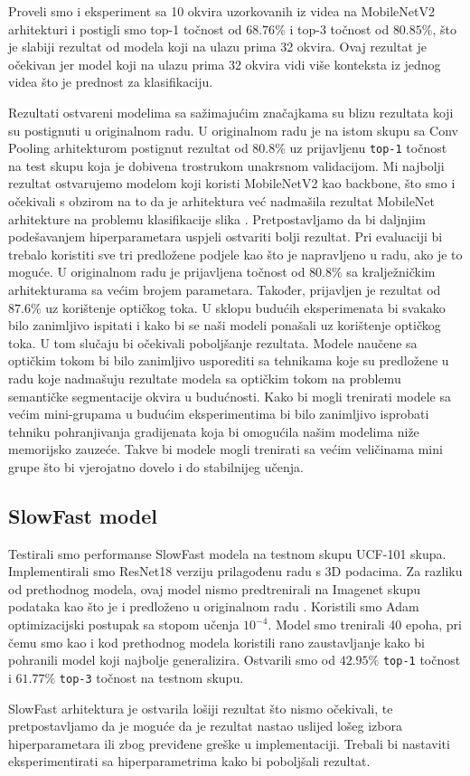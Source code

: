 \documentclass[times, utf8, diplomski,  numeric]{fer}
\begin{document}
\par
Proveli smo i eksperiment sa 10 okvira uzorkovanih iz videa na MobileNetV2 arhitekturi i postigli smo top-1 točnost od $68.76\%$ i top-3 točnost od $80.85\%$, što je slabiji rezultat od modela koji na ulazu prima 32 okvira. Ovaj rezultat je očekivan jer model koji na ulazu prima 32 okvira vidi više konteksta iz jednog videa što je prednost za klasifikaciju.
\par
Rezultati ostvareni modelima sa sažimajućim značajkama su blizu rezultata koji su postignuti u originalnom radu. U originalnom radu je na istom skupu sa Conv Pooling arhitekturom postignut rezultat od 80.8\% uz prijavljenu \verb|top-1| točnost na test skupu koja je dobivena trostrukom unakrsnom validacijom. Mi najbolji rezultat ostvarujemo modelom koji koristi MobileNetV2 kao backbone, što smo i očekivali s obzirom na to da je arhitektura već nadmašila rezultat MobileNet arhitekture na problemu klasifikacije slika \cite{mobilenetv2}. Pretpostavljamo da bi daljnjim podešavanjem hiperparametara uspjeli ostvariti bolji rezultat. Pri evaluaciji bi trebalo koristiti sve tri predložene podjele kao što je napravljeno u radu, ako je to moguće. U originalnom radu je prijavljena točnost od $80.8\%$ sa kralježničkim arhitekturama sa većim brojem parametara. Također, prijavljen je rezultat od $87.6\%$ uz korištenje optičkog toka. U sklopu budućih eksperimenata bi svakako bilo zanimljivo ispitati i kako bi se naši modeli ponašali uz korištenje optičkog toka. U tom slučaju bi očekivali poboljšanje rezultata. Modele naučene sa optičkim tokom bi bilo zanimljivo usporediti sa tehnikama koje su predložene u radu \cite{saric20cvpr} koje nadmašuju rezultate modela sa optičkim tokom na problemu semantičke segmentacije okvira u budućnosti. Kako bi mogli trenirati modele sa većim mini-grupama u budućim eksperimentima bi bilo zanimljivo isprobati tehniku pohranjivanja gradijenata koja bi omogućila našim modelima niže memorijsko zauzeće. Takve bi modele mogli trenirati sa većim veličinama mini grupe što bi vjerojatno dovelo i do stabilnijeg učenja.
\subsection{SlowFast model}
Testirali smo performanse SlowFast modela na testnom skupu UCF-101 skupa. Implementirali smo ResNet18 verziju prilagođenu radu s 3D podacima. Za razliku od prethodnog modela, ovaj model nismo predtrenirali na Imagenet skupu podataka kao što je i predloženo u originalnom radu \cite{slow-fast}.  Koristili smo Adam optimizacijski postupak sa stopom učenja $10^{-4}$. Model smo trenirali 40 epoha, pri čemu smo kao i kod prethodnog modela koristili rano zaustavljanje kako bi pohranili model koji najbolje generalizira. Ostvarili smo od $42.95\%$ \verb|top-1| točnost i $61.77\%$ \verb|top-3| točnost na testnom skupu.
\par
SlowFast arhitektura je ostvarila lošiji rezultat što nismo očekivali, te pretpostavljamo da je moguće da je rezultat nastao uslijed lošeg izbora hiperparametara ili zbog previđene greške u implementaciji. Trebali bi nastaviti eksperimentirati sa hiperparametrima kako bi poboljšali rezultat.
\end{document}
